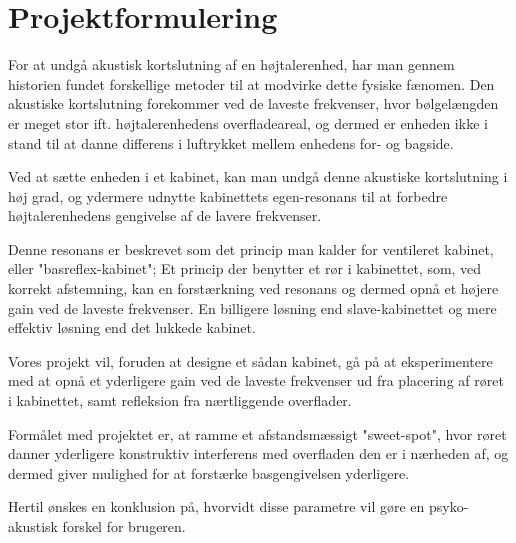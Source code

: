 \chapter{Projektformulering}

For at undgå akustisk kortslutning af en højtalerenhed, har man gennem historien fundet forskellige metoder til at modvirke dette fysiske fænomen. 
Den akustiske kortslutning forekommer ved de laveste frekvenser, hvor bølgelængden er meget stor ift. højtalerenhedens overfladeareal, og dermed er enheden ikke i stand til at danne differens i luftrykket mellem enhedens for- og bagside.

Ved at sætte enheden i et kabinet, kan man undgå denne akustiske kortslutning i høj grad, og ydermere udnytte kabinettets egen-resonans til at forbedre højtalerenhedens gengivelse af de lavere frekvenser. 

Denne resonans er beskrevet som det princip man kalder for ventileret kabinet, eller "basreflex-kabinet"; Et princip der benytter et rør i kabinettet, som, ved korrekt afstemning, kan en forstærkning ved resonans og dermed opnå et højere gain ved de laveste frekvenser. En billigere løsning end slave-kabinettet og mere effektiv løsning end det lukkede kabinet. 

Vores projekt vil, foruden at designe et sådan kabinet, gå på at eksperimentere med at opnå et yderligere gain ved de laveste frekvenser ud fra placering af røret i kabinettet, samt refleksion fra nærtliggende overflader. 

Formålet med projektet er, at ramme et afstandsmæssigt "sweet-spot", hvor røret danner yderligere konstruktiv interferens med overfladen den er i nærheden af, og dermed giver mulighed for at forstærke basgengivelsen yderligere. 

Hertil ønskes en konklusion på, hvorvidt disse parametre vil gøre en psyko-akustisk forskel for brugeren. 
